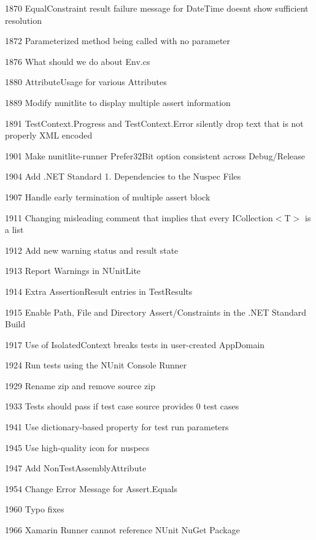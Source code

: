 \begin{DoxyItemize}
\item 1870 Equal\+Constraint result failure message for Date\+Time doesn\textquotesingle{}t show sufficient resolution
\item 1872 Parameterized method being called with no parameter
\item 1876 What should we do about Env.\+cs
\item 1880 Attribute\+Usage for various Attributes
\item 1889 Modify nunitlite to display multiple assert information
\item 1891 Test\+Context.\+Progress and Test\+Context.\+Error silently drop text that is not properly X\+ML encoded
\item 1901 Make nunitlite-\/runner Prefer32\+Bit option consistent across Debug/\+Release
\item 1904 Add .N\+ET Standard 1. Dependencies to the Nuspec Files
\item 1907 Handle early termination of multiple assert block
\item 1911 Changing misleading comment that implies that every {\ttfamily I\+Collection$<$T$>$} is a list
\item 1912 Add new warning status and result state
\item 1913 Report Warnings in N\+Unit\+Lite
\item 1914 Extra Assertion\+Result entries in Test\+Results
\item 1915 Enable Path, File and Directory Assert/\+Constraints in the .N\+ET Standard Build
\item 1917 Use of Isolated\+Context breaks tests in user-\/created App\+Domain
\item 1924 Run tests using the N\+Unit Console Runner
\item 1929 Rename zip and remove source zip
\item 1933 Tests should pass if test case source provides 0 test cases
\item 1941 Use dictionary-\/based property for test run parameters
\item 1945 Use high-\/quality icon for nuspecs
\item 1947 Add Non\+Test\+Assembly\+Attribute
\item 1954 Change Error Message for Assert.\+Equals
\item 1960 Typo fixes
\item 1966 Xamarin Runner cannot reference N\+Unit Nu\+Get Package
\end{DoxyItemize}

